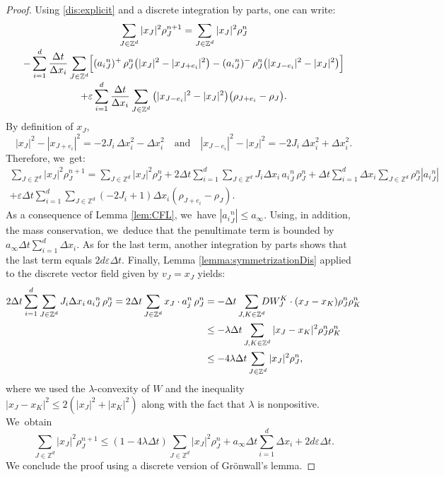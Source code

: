 \documentclass[JEP,XML,SOM,Unicode, NoFloatCountersInSection,published]{cedram}
\def\ZZ{\mathbb{Z}}
\def\eps{\varepsilon}
\def\dt{\Delta t}
\def\dx{\Delta x}
\theoremstyle{plain}
\theoremstyle{definition}
\begin{document}
\begin{proof}
Using \eqref{dis:explicit} and a discrete integration by parts,
one can write:\vspace*{-3pt}
\begin{multline*}
\sum_{J\in \ZZ^d} |x_J|^2 \rho_{J}^{n+1} =\sum_{J\in
\ZZ^d} |x_J|^2\rho_{J}^n\\[-3pt]
- \sum_{i=1}^d
\frac{\dt}{\dx_i} \sum_{J\in
\ZZ^d} \Bigl[ ({a_i}^n_{J})^+ \, \rho_{J}^n \big(|x_J|^2-|x_{J+e_i}|^2\big)
-({a_i}^n_{J})^- \, \rho_{J}^n \big(|x_{J-e_i}|^2-|x_{J}|^2\big)
\Bigr]
\\[-3pt]
+ \eps \sum_{i=1}^d
\frac{\dt}{\dx_i} \sum_{J\in
\ZZ^d}\big(|x_{J-e_i}|^2 - |x_J|^2\big)\big(\rho_{J+e_i} - \rho_J\big).
\end{multline*}
By definition of $x_J$,\vspace*{-3pt}
\[
|x_J|^2-|x_{J+e_i}|^2=-2J_i\, \dx_i^2 - \dx_i^2\quad\text{and}\quad
|x_{J-e_i}|^2-|x_J|^2=-2J_i\, \dx_i^2 + \dx_i^2.
\]
Therefore, we~get:\vspace*{-3pt}
\begin{multline*}
\sum_{J\in \ZZ^d} |x_J|^2 \rho_{J}^{n+1} = \sum_{J\in \ZZ^d}
|x_J|^2 \rho_{J}^{n} + 2\dt \sum_{i=1}^d\sum_{J\in \ZZ^d}
J_i \dx_i \, {a_i}^n_{J} \, \rho_{J}^n + \dt\sum_{i=1}^d \dx_i \sum_{J\in \ZZ^d} \rho_{J}^n |{a_i}^n_{J}| \\
+ \eps \dt\sum_{i=1}^d \sum_{J\in \ZZ^d} (-2J_i + 1) \dx_i(\rho_{J+e_i} - \rho_J).
\end{multline*}
As a consequence of Lemma \ref{lem:CFL}, we~have $|{a_i}^n_{J}|\leq a_\infty$.
Using, in addition, the mass conservation, we~deduce that the penultimate term is bounded by $a_\infty \dt \sum_{i=1}^d \dx_i$.
As for the last term, another integration by parts shows that the last term equals $2d\eps \dt$. Finally, Lemma \ref{lemma:symmetrizationDis} applied to the discrete vector field given by $v_J = x_J$ yields:\vspace*{-3pt}
\begin{align*}
2\dt \sum_{i=1}^d\sum_{J\in \ZZ^d}
J_i \dx_i \, {a_i}^n_{J} \, \rho_{J}^n = 2\dt \sum_{J\in \ZZ^d} x_J \cdot a_j^n \, \rho_{J}^n & = - \dt \sum_{J, K \in \ZZ^d}\hspace*{-2mm} DW_J^K \cdot (x_J - x_K) \rho_J^n \rho_K^n\\
& \leq - \lambda \dt \sum_{J, K \in \ZZ^d} |x_J - x_K|^2 \rho_J^n \rho_K^n \\
& \leq - 4\lambda \dt \sum_{J\in \ZZ^d} |x_J|^2 \rho_{J}^{n},
\end{align*}
where we used the $\lambda$-convexity of $W$ and the inequality $|x_J - x_K|^2 \leq 2(|x_J|^2 + |x_K|^2)$ along with the fact that $\lambda$ is nonpositive. We~obtain\vspace*{-3pt}
\[
\sum_{J\in \ZZ^d} |x_J|^2 \rho_{J}^{n+1} \leq
(1-4\lambda\dt)\sum_{J\in \ZZ^d} |x_J|^2 \rho_{J}^{n}
+ a_\infty\dt\sum_{i=1}^d\dx_i + 2d\eps \dt.
\]
We conclude the proof using a discrete version of Grönwall's lemma.
\end{proof}
\end{document}
